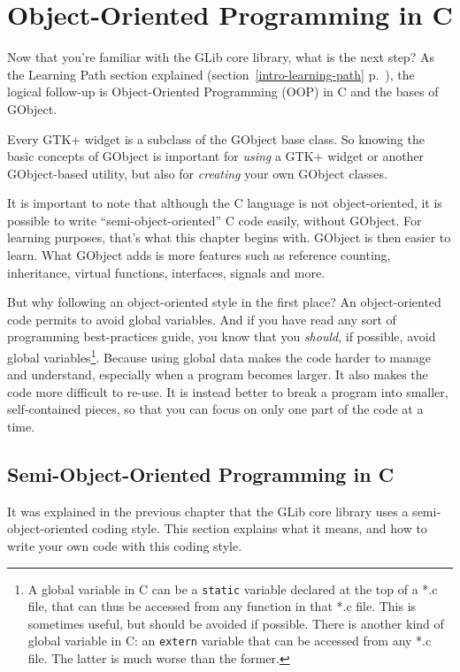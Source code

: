 \chapter{Object-Oriented Programming in C}
\label{oop}

Now that you're familiar with the GLib core library, what is the next step? As the Learning Path section explained (section~\ref{intro-learning-path} p.~\pageref{intro-learning-path}), the logical follow-up is Object-Oriented Programming (OOP) in C and the bases of GObject.

Every GTK+ widget is a subclass of the GObject base class. So knowing the basic concepts of GObject is important for \emph{using} a GTK+ widget or another GObject-based utility, but also for \emph{creating} your own GObject classes.

It is important to note that although the C language is not object-oriented, it is possible to write ``semi-object-oriented'' C code easily, without GObject. For learning purposes, that's what this chapter begins with. GObject is then easier to learn. What GObject adds is more features such as reference counting, inheritance, virtual functions, interfaces, signals and more.

But why following an object-oriented style in the first place? An object-oriented code permits to avoid global variables. And if you have read any sort of programming best-practices guide, you know that you \emph{should}, if possible, avoid global variables\footnote{A global variable in C can be a \lstinline{static} variable declared at the top of a *.c file, that can thus be accessed from any function in that *.c file. This is sometimes useful, but should be avoided if possible. There is another kind of global variable in C: an \lstinline{extern} variable that can be accessed from any *.c file. The latter is much worse than the former.}. Because using global data makes the code harder to manage and understand, especially when a program becomes larger. It also makes the code more difficult to re-use. It is instead better to break a program into smaller, self-contained pieces, so that you can focus on only one part of the code at a time.

\section{Semi-Object-Oriented Programming in C}

It was explained in the previous chapter that the GLib core library uses a semi-object-oriented coding style. This section explains what it means, and how to write your own code with this coding style.

